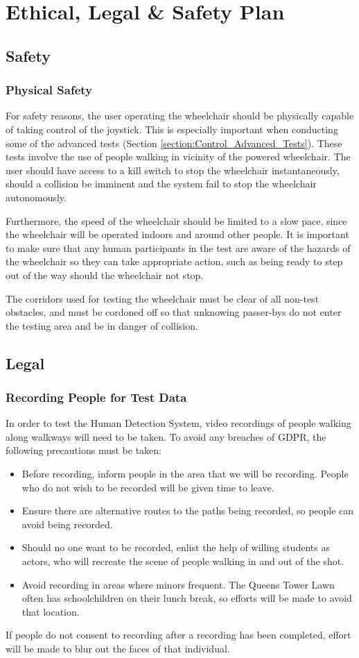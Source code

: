 \documentclass[12pt,a4paper]{report}
\begin{document}
\chapter{Ethical, Legal \& Safety Plan}

\section{Safety}

\subsection{Physical Safety}
For safety reasons, the user operating the wheelchair should be physically capable of taking control of the joystick. This is especially important when conducting some of the advanced tests (Section \ref{section:Control_Advanced_Tests}). These tests involve the use of people walking in vicinity of the powered wheelchair. The user should have access to a kill switch to stop the wheelchair instantaneously, should a collision be imminent and the system fail to stop the wheelchair autonomously.

Furthermore, the speed of the wheelchair should be limited to a slow pace, since the wheelchair will be operated indoors and around other people. It is important to make sure that any human participants in the test are aware of the hazards of the wheelchair so they can take appropriate action, such as being ready to step out of the way should the wheelchair not stop.

The corridors used for testing the wheelchair must be clear of all non-test obstacles, and must be cordoned off so that unknowing passer-bys do not enter the testing area and be in danger of collision.

\section{Legal}

\subsection{Recording People for Test Data}
In order to test the Human Detection System, video recordings of people walking along walkways will need to be taken. To avoid any breaches of GDPR, the following precautions must be taken:

\begin{itemize}
	\item Before recording, inform people in the area that we will be recording. People who do not wish to be recorded will be given time to leave.
	\item Ensure there are alternative routes to the paths being recorded, so people can avoid being recorded.
	\item Should no one want to be recorded, enlist the help of willing students as actors, who will recreate the scene of people walking in and out of the shot.
	\item Avoid recording in areas where minors frequent. The Queens Tower Lawn often has schoolchildren on their lunch break, so efforts will be made to avoid that location.
\end{itemize}

If people do not consent to recording after a recording has been completed, effort will be made to blur out the faces of that individual.
\end{document}
